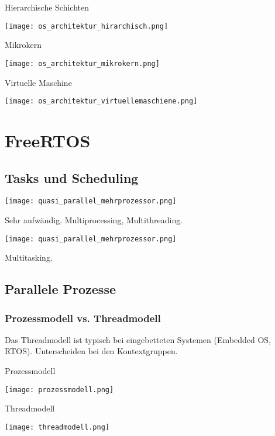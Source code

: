 \begin{minipage}[t]{.45\linewidth}
	\centering
	Hierarchische Schichten

	\texttt{[image: os\_architektur\_hirarchisch.png]}
\end{minipage}\hfill
\begin{minipage}[t]{.45\linewidth}
	\centering
	Mikrokern

	\texttt{[image: os\_architektur\_mikrokern.png]}
\end{minipage}

\begin{minipage}[t]{\linewidth}
	\centering
	Virtuelle Maschine

	\texttt{[image: os\_architektur\_virtuellemaschiene.png]}
\end{minipage}


\section{FreeRTOS}

\subsection{Tasks und Scheduling}

\begin{center}
	\texttt{[image: quasi\_parallel\_mehrprozessor.png]}
\end{center}

Sehr aufwändig. Multiprocessing, Multithreading.

\begin{center}
	\texttt{[image: quasi\_parallel\_mehrprozessor.png]}
\end{center}

Multitasking.

\subsection{Parallele Prozesse}
\subsubsection{Prozessmodell vs. Threadmodell}
Das Threadmodell ist typisch bei eingebetteten Systemen (Embedded OS, RTOS). Unterscheiden bei den Kontextgruppen.

\begin{minipage}[t]{.49\linewidth}
	Prozessmodell

	\texttt{[image: prozessmodell.png]}
\end{minipage}\hfill
\begin{minipage}[t]{.49\linewidth}
	Threadmodell

	\texttt{[image: threadmodell.png]}
\end{minipage}

